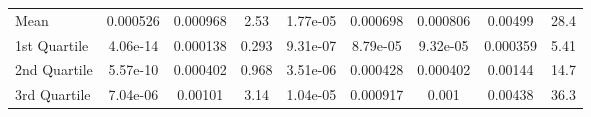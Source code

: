 {\begin{tabular} {lcccccccc}
\hspace{7pt}Mean & 0.000526 & 0.000968 & 2.53 & 1.77e-05 & 0.000698 & 0.000806 & \cellcolor{bronze!60}0.00499 & 28.4 \\ 
\hspace{7pt}1st Quartile & 4.06e-14 & 0.000138 & 0.293 & 9.31e-07 & \cellcolor{gold!60}8.79e-05 & \cellcolor{gold!60}9.32e-05 & \cellcolor{bronze!60}0.000359 & \cellcolor{bronze!60}5.41 \\ 
\hspace{7pt}2nd Quartile & 5.57e-10 & 0.000402 & 0.968 & 3.51e-06 & \cellcolor{bronze!60}0.000428 & 0.000402 & \cellcolor{silver!60}0.00144 & 14.7 \\ 
\hspace{7pt}3rd Quartile & 7.04e-06 & 0.00101 & 3.14 & 1.04e-05 & \cellcolor{bronze!60}0.000917 & 0.001 & \cellcolor{bronze!60}0.00438 & 36.3 \\ 
\bottomrule
\end{tabular}}